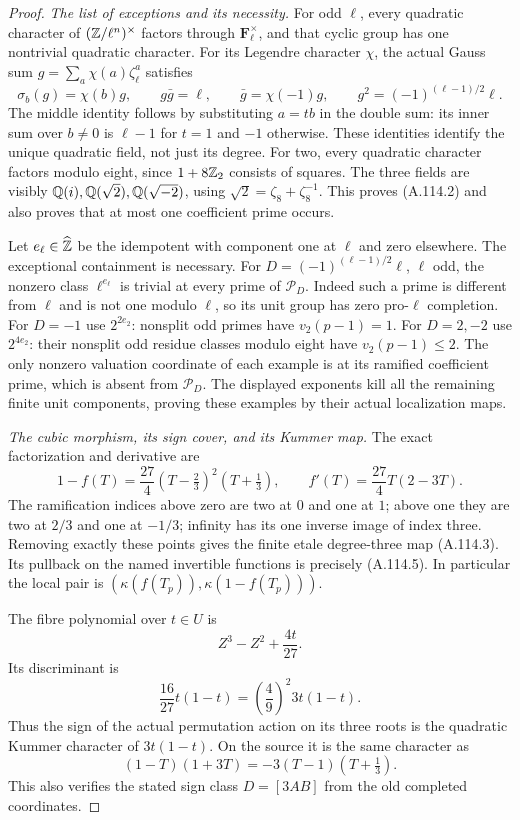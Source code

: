 \begin{proof}
\emph{The list of exceptions and its necessity.}
For odd $\ell$, every quadratic character of
$(\mathbb Z/\ell^n)^\times$ factors through
$\mathbf F_\ell^\times$, and that cyclic group
has one nontrivial quadratic character.
For its Legendre character $\chi$, the actual
Gauss sum $g=\sum_a\chi(a)\zeta_\ell^a$ satisfies
\[
 \sigma_b(g)=\chi(b)g,\qquad
 g\bar g=\ell,\qquad
 \bar g=\chi(-1)g,
 \qquad g^2=(-1)^{(\ell-1)/2}\ell.
\tag{A.114.9}
\]
The middle identity follows by substituting
$a=tb$ in the double sum: its inner sum over
$b\ne0$ is $\ell-1$ for $t=1$ and $-1$
otherwise.  These identities identify the
unique quadratic field, not just its degree.
For two, every quadratic character factors
modulo eight, since $1+8\mathbb Z_2$ consists of
squares.  The three fields are visibly
$\mathbb Q(i),\mathbb Q(\sqrt2),\mathbb Q(\sqrt{-2})$, using
$\sqrt2=\zeta_8+\zeta_8^{-1}$.
This proves (A.114.2) and also proves that
at most one coefficient prime occurs.

Let $e_\ell\in\widehat{\mathbb Z}$ be the idempotent
with component one at $\ell$ and zero elsewhere.
The exceptional containment is necessary.
For $D=(-1)^{(\ell-1)/2}\ell$, $\ell$ odd,
the nonzero class $\ell^{e_\ell}$ is trivial
at every prime of $\mathcal P_D$.
Indeed such a prime is different from $\ell$
and is not one modulo $\ell$, so its unit
group has zero pro-$\ell$ completion.
For $D=-1$ use $2^{2e_2}$: nonsplit odd
primes have $v_2(p-1)=1$.
For $D=2,-2$ use $2^{4e_2}$: their nonsplit
odd residue classes modulo eight have
$v_2(p-1)\le2$.
The only nonzero valuation coordinate of each
example is at its ramified coefficient prime,
which is absent from $\mathcal P_D$.
The displayed exponents kill all the remaining
finite unit components, proving these examples
by their actual localization maps.

\emph{The cubic morphism, its sign cover, and its Kummer map.}
The exact factorization and derivative are
\[
 1-f(T)=\frac{27}{4}(T-\tfrac23)^2(T+\tfrac13),
 \qquad f'(T)=\frac{27}{4}T(2-3T).
\tag{A.114.10}
\]
The ramification indices above zero are two
at $0$ and one at $1$; above one they are
two at $2/3$ and one at $-1/3$; infinity
has its one inverse image of index three.
Removing exactly these points gives the
finite etale degree-three map (A.114.3).
Its pullback on the named invertible functions
is precisely (A.114.5).
In particular the local pair is
$(\kappa(f(T_p)),\kappa(1-f(T_p)))$.

The fibre polynomial over $t\in U$ is
\[
           Z^3-Z^2+\frac{4t}{27}.
\tag{A.114.11}
\]
Its discriminant is
\[
          \frac{16}{27}t(1-t)
                   =\left(\frac49\right)^2 3t(1-t).
\tag{A.114.12}
\]
Thus the sign of the actual permutation
action on its three roots is the quadratic
Kummer character of $3t(1-t)$.
On the source it is the same character as
\[
                  (1-T)(1+3T)
                         =-3(T-1)(T+\tfrac13).
\tag{A.114.13}
\]
This also verifies the stated sign class
$D=[3AB]$ from the old completed coordinates.


\end{proof}
